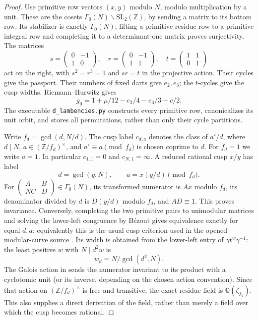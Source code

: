 \begin{proof}
Use primitive row vectors $(x,y)$ modulo $N$, modulo multiplication by a unit. These are the cosets $\Gamma_0(N)\backslash\mathrm{SL}_2(\mathbb Z)$, by sending a matrix to its bottom row. Its stabilizer is exactly $\Gamma_0(N)$; lifting a primitive residue row to a primitive integral row and completing it to a determinant-one matrix proves surjectivity. The matrices
\[
 s=\begin{pmatrix}0&-1\\1&0\end{pmatrix},\quad
 r=\begin{pmatrix}0&-1\\1&1\end{pmatrix},\quad
 t=\begin{pmatrix}1&1\\0&1\end{pmatrix}
\]
act on the right, with $s^2=r^3=1$ and $sr=t$ in the projective action. Their cycles give the passport. Their numbers of fixed darts give $e_2,e_3$; the $t$-cycles give the cusp widths. Riemann--Hurwitz gives
\[
 g_0=1+\mu/12-e_2/4-e_3/3-c/2.
\]
The executable \texttt{d\_lambencies.py} constructs every primitive row, canonicalizes its unit orbit, and stores all permutations, rather than only their cycle partitions.

Write $f_d=\gcd(d,N/d)$. The cusp label $c_{d,a}$ denotes the class of $a'/d$, where $d\mid N$, $a\in(\mathbb Z/f_d)^\times$, and $a'\equiv a\pmod{f_d}$ is chosen coprime to $d$. For $f_d=1$ we write $a=1$. In particular $c_{1,1}=0$ and $c_{N,1}=\infty$. A reduced rational cusp $x/y$ has label
\[
 d=\gcd(y,N),\qquad a=x(y/d)\pmod{f_d}.
\]
For $\left(\begin{smallmatrix}A&B\\NC&D\end{smallmatrix}\right)\in\Gamma_0(N)$, its transformed numerator is $Ax$ modulo $f_d$, its denominator divided by $d$ is $D(y/d)$ modulo $f_d$, and $AD\equiv1$. This proves invariance. Conversely, completing the two primitive pairs to unimodular matrices and solving the lower-left congruence by B\'ezout gives equivalence exactly for equal $d,a$; equivalently this is the usual cusp criterion used in the opened modular-curve source \cite{RouseWebb2015}. Its width is obtained from the lower-left entry of $\gamma t^w\gamma^{-1}$: the least positive $w$ with $N\mid d^2w$ is
\[
 w_d=N/\gcd(d^2,N).
\]
The Galois action in \cite[Theorem~16]{RouseWebb2015} sends the numerator invariant to its product with a cyclotomic unit (or its inverse, depending on the chosen action convention). Since that action on $(\mathbb Z/f_d)^\times$ is free and transitive, the exact residue field is $\mathbb Q(\zeta_{f_d})$. This also supplies a direct derivation of the field, rather than merely a field over which the cusp becomes rational.


\end{proof}

